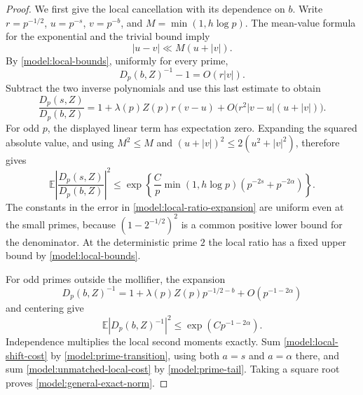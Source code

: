 \begin{proof}
We first give the local cancellation with its dependence on $b$.
Write $r=p^{-1/2}$, $u=p^{-s}$, $v=p^{-b}$, and
$M=\min(1,h\log p)$.  The mean-value formula for the exponential and
the trivial bound imply
\begin{equation}
 |u-v|\ll M(u+|v|).
 \label{model:local-difference}
\end{equation}
By \eqref{model:local-bounds}, uniformly for every prime,
\[
 D_p(b,Z)^{-1}-1=O(r|v|).
\]
Subtract the two inverse polynomials and use this last estimate to
obtain
\begin{equation}
 \frac{D_p(s,Z)}{D_p(b,Z)}
 =1+\lambda(p)Z(p)r(v-u)
      +O\big(r^2|v-u|(u+|v|)\big).
 \label{model:local-ratio-expansion}
\end{equation}
For odd $p$, the displayed linear term has expectation zero.  Expanding
the squared absolute value, and using $M^2\le M$ and
$(u+|v|)^2\le2(u^2+|v|^2)$, therefore gives
\begin{equation}
 \mathbb E\left|\frac{D_p(s,Z)}{D_p(b,Z)}\right|^2
 \le \exp\left\{\frac Cp\min(1,h\log p)
                    (p^{-2s}+p^{-2\alpha})\right\}.
 \label{model:local-shift-cost}
\end{equation}
The constants in the error in \eqref{model:local-ratio-expansion} are
uniform even at the small primes, because
$(1-2^{-1/2})^2$ is a common positive lower bound for the denominator.
At the deterministic prime $2$ the local ratio has a fixed upper bound
by \eqref{model:local-bounds}.

For odd primes outside the mollifier, the expansion
\[
 D_p(b,Z)^{-1}=1+\lambda(p)Z(p)p^{-1/2-b}
                       +O(p^{-1-2\alpha})
\]
and centering give
\begin{equation}
 \mathbb E|D_p(b,Z)^{-1}|^2
       \le \exp(Cp^{-1-2\alpha}).
 \label{model:unmatched-local-cost}
\end{equation}
Independence multiplies the local second moments exactly.  Sum
\eqref{model:local-shift-cost} by
\eqref{model:prime-transition}, using both $a=s$ and $a=\alpha$
there, and sum \eqref{model:unmatched-local-cost} by
\eqref{model:prime-tail}.  Taking a square root proves
\eqref{model:general-exact-norm}.


\end{proof}

